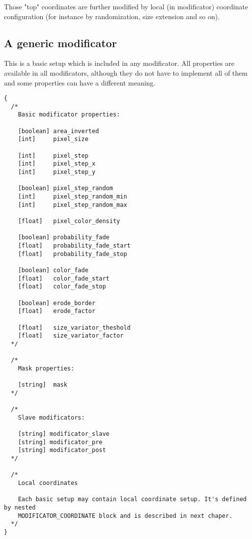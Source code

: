 \documentclass[9pt]{article}
\begin{document}
Those "top" coordinates are further modified by local (in modificator) 
coordinate configuration (for instance by randomization, size extension
and so on).

\subsection{A generic modificator}

This is a basic setup which is included in any modificator.
All properties are available in all modificators,
although they do not have to implement all of them
and some properties can have a different meaning.
\begin{verbatim}
{
  /*
    Basic modificator properties:
  
    [boolean] area_inverted
    [int]     pixel_size
    
    [int]     pixel_step
    [int]     pixel_step_x
    [int]     pixel_step_y
  
    [boolean] pixel_step_random
    [int]     pixel_step_random_min
    [int]     pixel_step_random_max
    
    [float]   pixel_color_density
    
    [boolean] probability_fade
    [float]   probability_fade_start
    [float]   probability_fade_stop
  
    [boolean] color_fade
    [float]   color_fade_start
    [float]   color_fade_stop
      
    [boolean] erode_border
    [float]   erode_factor
    
    [float]   size_variator_theshold
    [float]   size_variator_factor
  */    
    
  /*
    Mask properties:
    
    [string]  mask
  */
    
  /*
    Slave modificators:
  
    [string] modificator_slave
    [string] modificator_pre
    [string] modificator_post
  */  

  /*
    Local coordinates
    
    Each basic setup may contain local coordinate setup. It's defined by nested 
    MODIFICATOR_COORDINATE block and is described in next chaper.
  */
}
\end{verbatim}
\end{document}
